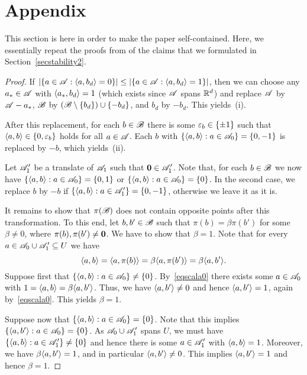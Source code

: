 \appendix

\section{Appendix}\label{appendix}

This section is here in order to make the paper self-contained. Here, we essentially repeat the proofs from \cite{kupavskii22} of the claims that we formulated  in  Section~\ref{secstability2}. 

\claimassumptions*
\begin{proof}
    If $|\{ a \in {\mathscr{A}} : \langle a, b_d\rangle = 0\}| \le |\{ a \in {\mathscr{A}} : \langle a, b_d\rangle = 1\}|$, then we can choose any $a_* \in {\mathscr{A}}$ with $\langle a_*, b_d\rangle = 1$ (which exists since ${\mathscr{A}}$ spans ${\mathbb{R}}^d$) and replace ${\mathscr{A}}$ by ${\mathscr{A}} - a_*$, ${\mathscr{B}}$ by $({\mathscr{B}} \setminus \{b_d\}) \cup \{-b_d\}$, and $b_d$ by $-b_d$.
    This yields~(i).

    After this replacement, for each $b \in {\mathscr{B}}$ there is some ${\varepsilon}_b \in \{\pm 1\}$ such that $\langle a, b\rangle \in \{0,{\varepsilon}_b\}$ holds for all $a \in {\mathscr{A}}$.
    Each $b$ with $\{\langle a,b\rangle : a \in {\mathscr{A}}_0\} = \{0,-1\}$ is replaced by $-b$, which yields~(ii).

    Let ${\mathscr{A}}_1'$ be a translate of ${\mathscr{A}}_1$ such that $\mathbf{0} \in {\mathscr{A}}_1'$.
    Note that, for each $b \in {\mathscr{B}}$ we now have $\{\langle a,b\rangle : a \in {\mathscr{A}}_0\} = \{0,1\}$ or $\{\langle a,b\rangle : a \in {\mathscr{A}}_0\} = \{0\}$.
    In the second case, we replace $b$ by $-b$ if $\{\langle a,b\rangle : a \in {\mathscr{A}}_1'\} = \{0,-1\}$, otherwise we leave it as it is.

    It remains to show that $\pi({\mathscr{B}})$ does not contain opposite points after this transformation.
    To this end, let $b,b' \in {\mathscr{B}}$ such that $\pi(b) = \beta \pi(b')$ for some $\beta \ne 0$, where $\pi(b),\pi(b') \ne \mathbf{0}$.
    We have to show that $\beta = 1$.
    Note that for every $a \in {\mathscr{A}}_0 \cup {\mathscr{A}}_1' \subseteq U$ we have
    \[
        \langle a,b\rangle = \langle a, \pi(b)\rangle = \beta \langle a, \pi(b')\rangle = \beta \langle a,b'\rangle.
    \]
    Suppose first that $\{\langle a,b\rangle : a \in {\mathscr{A}}_0\} \ne \{0\}$.
    By~\eqref{eqscala0} there exists some $a \in {\mathscr{A}}_0$ with $1 = \langle a,b\rangle = \beta \langle a,b'\rangle$.
    Thus, we have $\langle a,b'\rangle \ne 0$ and hence $\langle a,b'\rangle = 1$, again by~\eqref{eqscala0}.
    This yields $\beta = 1$.

    Suppose now that $\{\langle a,b\rangle : a \in {\mathscr{A}}_0\} = \{0\}$.
    Note that this implies $\{\langle a,b'\rangle : a \in {\mathscr{A}}_0\} = \{0\}$.
    As ${\mathscr{A}}_0 \cup {\mathscr{A}}_1'$ spans $U$, we must have $ \{\langle a,b\rangle : a \in {\mathscr{A}}_1'\} \ne \{0\}$ and hence there is some $a \in {\mathscr{A}}_1'$ with $\langle a,b\rangle = 1$.
    Moreover, we have $\beta \langle a,b'\rangle = 1$, and in particular $\langle a,b'\rangle \ne 0$.
    This implies $\langle a,b'\rangle = 1$ and hence $\beta = 1$.
\end{proof}

